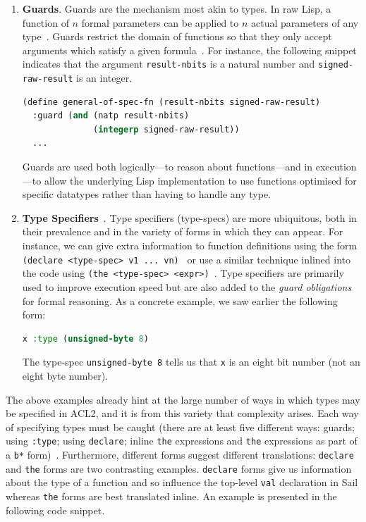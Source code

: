 \documentclass[a4paper,12pt,twoside,openright]{report}
\begin{document}
\begin{enumerate}
	\item \textbf{Guards}.  Guards are the mechanism most akin to types.  In raw Lisp, a function of $n$ formal parameters can be applied to $n$ actual parameters of any type~\cite{types-about-types}.  Guards restrict the domain of functions so that they only accept arguments which satisfy a given formula~\cite{types-guard-intro}.  For instance, the following snippet indicates that the argument \texttt{result-nbits} is a natural number and \texttt{signed-raw-result} is an integer.

\begin{minipage}{\linewidth}
	\begin{lstlisting}[language=lisp]
(define general-of-spec-fn (result-nbits signed-raw-result)
  :guard (and (natp result-nbits)
              (integerp signed-raw-result))
  ...
	\end{lstlisting}
\end{minipage}

	Guards are used both logically---to reason about functions---and in execution---to allow the underlying Lisp implementation to use functions optimised for specific datatypes rather than having to handle any type.

	\item \textbf{Type Specifiers}~\cite{types-type-spec}.  Type specifiers (type-specs) are more ubiquitous, both in their prevalence and in the variety of forms in which they can appear.  For instance, we can give extra information to function definitions using the form \texttt{(declare <type-spec> v1 ... vn)}~\cite{types-declare} or use a similar technique inlined into the code using \texttt{(the <type-spec> <expr>)}~\cite{types-the}.  Type specifiers are primarily used to improve execution speed but are also added to the \emph{guard obligations} for formal reasoning.  As a concrete example, we saw earlier the following form:

  \begin{lstlisting}[language=lisp]
  x :type (unsigned-byte 8)
  \end{lstlisting}

  The type-spec \texttt{unsigned-byte 8} tells us that \texttt{x} is an eight bit number (not an eight byte number).
\end{enumerate}

The above examples already hint at the large number of ways in which types may be specified in ACL2, and it is from this variety that complexity arises.  Each way of specifying types must be caught (there are at least five different ways: guards; using \texttt{:type}; using \texttt{declare}; inline \texttt{the} expressions and \texttt{the} expressions as part of a \texttt{b*} form)~\cite{types-guard-intro,types-xargs,types-declare,types-the,types-b-star}.  Furthermore, different forms suggest different translations: \texttt{declare} and \texttt{the} forms are two contrasting examples.  \texttt{declare} forms give us information about the type of a function and so influence the top-level \texttt{val} declaration in Sail whereas \texttt{the} forms are best translated inline.  An example is presented in the following code snippet.
\end{document}
